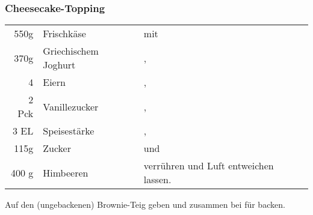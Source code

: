 \subsubsection{Cheesecake-Topping}
\begin{longtable}{rlL{15.7cm}}
	550g	&	Frischkäse 				& mit \\
	370g	&	Griechischem Joghurt	& , \\
	4		&	Eiern 					& , \\
	2 Pck	&	Vanillezucker 			& , \\
	3 EL	&	Speisestärke 			& , \\
	115g	&	Zucker 					& und \\
 	400 g	&	Himbeeren 				& verrühren und Luft entweichen lassen. \\
\end{longtable}

Auf den (ungebackenen) Brownie-Teig geben und zusammen bei  für  backen.